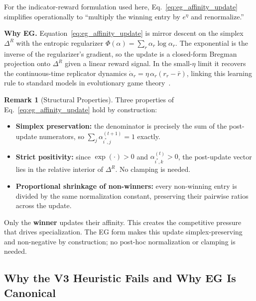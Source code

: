 \documentclass[11pt,a4paper]{article}
\theoremstyle{definition}
\newtheorem{remark}{Remark}[section]
\theoremstyle{plain}
\begin{document}
For the indicator-reward formulation used here, Eq.~\eqref{eq:eg_affinity_update}
simplifies operationally to ``multiply the winning entry by $e^{\eta}$ and renormalize.''

\begin{intuition}
\textbf{Why EG.} Equation~\eqref{eq:eg_affinity_update} is mirror descent on the simplex
$\Delta^R$ with the entropic regularizer $\Phi(\alpha) = \sum_r \alpha_r \log \alpha_r$.
The exponential is the inverse of the regularizer's gradient, so the
update is a closed-form Bregman projection onto $\Delta^R$ given a
linear reward signal. In the small-$\eta$ limit it recovers the
continuous-time replicator dynamics
$\dot\alpha_r = \eta\, \alpha_r (r_r - \bar r)$,
linking this learning rule to standard models in evolutionary game
theory~\cite{sandholm2010population}.
\end{intuition}

\begin{remark}[Structural Properties]
Three properties of Eq.~\eqref{eq:eg_affinity_update} hold by construction:
\begin{itemize}
    \item \textbf{Simplex preservation:} the denominator is precisely the
    sum of the post-update numerators, so $\sum_j \alpha_{i^*,j}^{(t+1)} = 1$ exactly.
    \item \textbf{Strict positivity:} since $\exp(\cdot) > 0$ and
    $\alpha_{i^*,k}^{(t)} > 0$, the post-update vector lies in the
    relative interior of $\Delta^R$. No clamping is needed.
    \item \textbf{Proportional shrinkage of non-winners:}
    every non-winning entry is divided by the same normalization
    constant, preserving their pairwise ratios across the update.
\end{itemize}
\end{remark}

\begin{keypoint}
Only the \textbf{winner} updates their affinity. This creates the
competitive pressure that drives specialization. The EG form makes
this update simplex-preserving and non-negative by construction; no
post-hoc normalization or clamping is needed.
\end{keypoint}

\subsection{Why the V3 Heuristic Fails and Why EG Is Canonical}
\label{sec:v3_v4_math}
\end{document}
